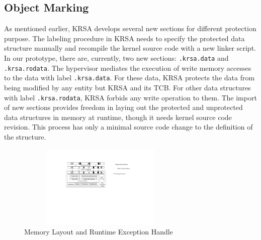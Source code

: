 \documentclass[conference]{IEEEtran}
\begin{document}
\subsection{Object Marking} \label{sec:objmarkimp}
As mentioned earlier, KRSA develops several new sections for different protection purpose. The labeling procedure in KRSA needs to specify the protected data structure manually and recompile the kernel source code with a new linker script. In our prototype, there are, currently, two new sections: \verb|.krsa.data| and \verb|.krsa.rodata|.
The hypervisor mediates the execution of write memory accesses to the data with label \verb|.krsa.data|. For these data, KRSA protects the data from being modified by any entity but KRSA and its TCB. For other data structures with label \verb|.krsa.rodata|, KRSA forbids any write operation to them. 
The import of new sections provides freedom in laying out the protected and unprotected data structures in memory at runtime, though it needs kernel source code revision. This process has only a minimal source code change to the definition of the structure. 
\begin{figure}
    \centering
    \includegraphics[width=8cm, height=4cm]{pic/imp.pdf}
    \caption{Memory Layout and Runtime Exception Handle}
    \setlength{\abovecaptionskip}{0pt}
    \setlength{\belowcaptionskip}{0pt}
    \label{pic_imp}
\end{figure}
\end{document}
